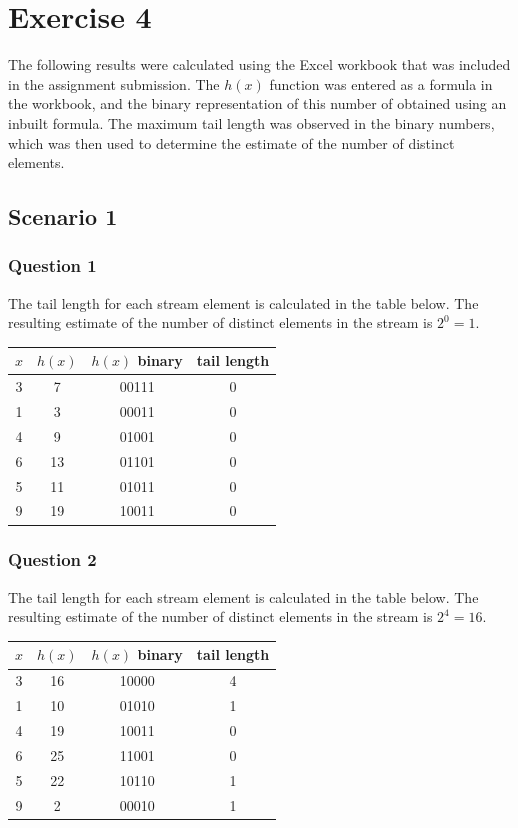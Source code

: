 \documentclass[12t]{article}
\begin{document}
	\section*{Exercise 4}
	
	The following results were calculated using the Excel workbook that was included in the assignment submission. The $h(x)$ function was entered as a formula in the workbook, and the binary representation of this number of obtained using an inbuilt formula. The maximum tail length was observed in the binary numbers, which was then used to determine the estimate of the number of distinct elements. 
	
	\subsection*{Scenario 1}
	
	\subsubsection*{Question 1}
	
	The tail length for each stream element is calculated in the table below. The resulting estimate of the number of distinct elements in the stream is $2^{0}=1$. \\
	
	\begin{tabular}{cccc}
	$x$ & $h(x)$ & $h(x)$ binary & tail length \\
	\hline
	3 & 7 & 00111 & 0 \\
	1 & 3 & 00011 & 0 \\
	4 & 9 & 01001 & 0 \\
	6 & 13 & 01101 & 0 \\
	5 & 11 & 01011 & 0 \\
	9 & 19 & 10011 & 0 \\
	\hline
	\end{tabular}
	
	\subsubsection*{Question 2}
	
	The tail length for each stream element is calculated in the table below. The resulting estimate of the number of distinct elements in the stream is $2^{4}=16$.\\
	
	\begin{tabular}{cccc}
	$x$ & $h(x)$ & $h(x)$ binary & tail length \\
	\hline
	3 & 16 & 10000 & 4 \\
	1 & 10 & 01010 & 1 \\
	4 & 19 & 10011 & 0 \\
	6 & 25 & 11001 & 0 \\
	5 & 22 & 10110 & 1 \\
	9 & 2 & 00010 & 1 \\
	\hline
	\end{tabular}
\end{document}
